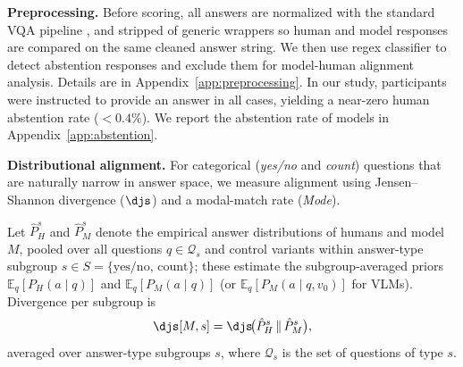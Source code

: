 \textbf{Preprocessing.} Before scoring, all answers are normalized with the standard VQA pipeline
\citep{antol2015vqa}, and stripped of generic wrappers so human and model
responses are compared on the same cleaned answer string.
We then use regex classifier to detect abstention responses and exclude them for model-human alignment analysis. Details are in Appendix~\ref{app:preprocessing}. %
In our study, participants were instructed to provide an answer in all cases, yielding a near-zero human abstention rate ($<\!0.4\%$). %
We report the abstention rate of models in Appendix~\ref{app:abstention}. %

\textbf{Distributional alignment.} For categorical (\textit{yes/no} and \textit{count}) questions that are naturally narrow in answer space, we measure alignment using Jensen--Shannon divergence ($\djs$) and a modal-match rate (\textit{Mode}).

Let $\hat{P}_{H}^{s}$ and $\hat{P}_{M}^{s}$ denote the empirical answer distributions of humans and model $M$, pooled over all questions $q\!\in\!\mathcal{Q}_{s}$ and control variants within answer-type subgroup $s\!\in\!S=\{\text{yes/no},\,\text{count}\}$; these estimate the subgroup-averaged priors $\mathbb{E}_{q}[P_{H}(a\mid q)]$ and $\mathbb{E}_{q}[P_{M}(a\mid q)]$ (or $\mathbb{E}_{q}[P_{M}(a\mid q,v_{0})]$ for VLMs).
Divergence per subgroup is
\begin{equation}
  \djs[M,s] = \djs\!\bigl(\hat{P}_{H}^{s} \,\|\, \hat{P}_{M}^{s}\bigr),
  \label{eq:js}
\end{equation}
averaged over answer-type subgroups $s$, where $\mathcal{Q}_s$ is the set of questions of type $s$.


